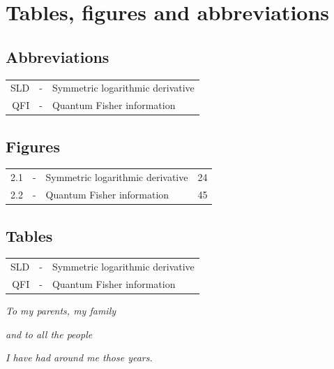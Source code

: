 \documentclass[12pt, letterpaper, twoside]{article}
\numberwithin{equation}{section}
\numberwithin{figure}{section}
\numberwithin{table}{section}
\begin{document}
\vspace*{100pt}
\tableofcontents

\section*{Tables, figures and abbreviations}
\fancyfoot[LE,RO]{\thepage}
\subsection*{Abbreviations}
\begin{tabular}{r c l}
  SLD & - & Symmetric logarithmic derivative \\
  QFI & - & Quantum Fisher information \\
\end{tabular}

\subsection*{Figures}

\begin{tabularx}{\textwidth}{r c X r}
  2.1 & - & Symmetric logarithmic derivative \dotfill & 24\\
  2.2 & - & Quantum Fisher information \dotfill & 45\\
\end{tabularx}

\subsection*{Tables}
\begin{tabular}{r c l}
  SLD & - & Symmetric logarithmic derivative \\
  QFI & - & Quantum Fisher information \\
\end{tabular}


\cleardoublepage

\fancyfoot{}

\cleardoublepage
\setcounter{page}{1}

\vspace*{100pt}
\begin{center}
\emph{To my parents, my family}

\emph{and to all the people}

\emph{I have had around me those years.}
\end{center}
\end{document}
